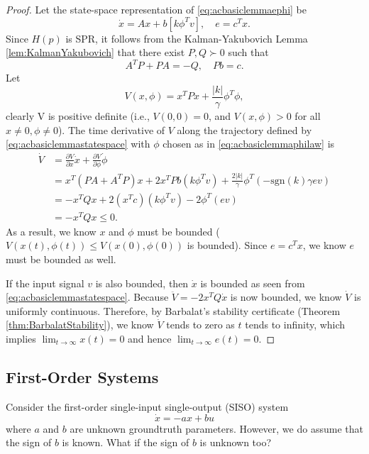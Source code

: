 \documentclass[
]{book}
\theoremstyle{definition}
\theoremstyle{definition}
\theoremstyle{definition}
\theoremstyle{definition}
\theoremstyle{remark}
\begin{document}
\begin{proof}
Let the state-space representation of \eqref{eq:acbasiclemmaephi} be
\begin{equation}
\dot{x} = A x + b [k \phi^T v], \quad e = c^T x.
\label{eq:acbasiclemmastatespace}
\end{equation}
Since \(H(p)\) is SPR, it follows from the Kalman-Yakubovich Lemma \ref{lem:KalmanYakubovich} that there exist \(P,Q \succ 0\) such that
\[
A^T P + P A = -Q, \quad Pb = c.
\]
Let
\[
V(x,\phi) = x^T P x + \frac{|k|}{\gamma} \phi^T \phi,
\]
clearly V is positive definite (i.e., \(V(0,0)=0\), and \(V(x,\phi) > 0\) for all \(x \neq 0, \phi \neq 0\)). The time derivative of \(V\) along the trajectory defined by \eqref{eq:acbasiclemmastatespace} with \(\phi\) chosen as in \eqref{eq:acbasiclemmaphilaw} is
\begin{align}
\dot{V} & = \frac{\partial V}{\partial x} \dot{x} + \frac{\partial V}{\partial \phi} \dot{\phi} \\
&= x^T (PA + A^T P) x + 2 x^T P b (k \phi^T v) + \frac{2|k|}{\gamma} \phi^T (- \mathrm{sgn}(k) \gamma e v) \\
& = - x^T Q x + 2 (x^T c)(k\phi^T v) - 2 \phi^T (e v) \\
& = - x^T Q x \leq 0.
\end{align}
As a result, we know \(x\) and \(\phi\) must be bounded (\(V(x(t),\phi(t)) \leq V(x(0),\phi(0))\) is bounded). Since \(e = c^T x\), we know \(e\) must be bounded as well.

If the input signal \(v\) is also bounded, then \(\dot{x}\) is bounded as seen from \eqref{eq:acbasiclemmastatespace}. Because \(\ddot{V} = -2x^T Q \dot{x}\) is now bounded, we know \(\dot{V}\) is uniformly continuous. Therefore, by Barbalat's stability certificate (Theorem \ref{thm:BarbalatStability}), we know \(\dot{V}\) tends to zero as \(t\) tends to infinity, which implies \(\lim_{t \rightarrow \infty} x(t) = 0\) and hence \(\lim_{t \rightarrow \infty} e(t) = 0\).
\end{proof}

\hypertarget{first-order-systems}{%
\subsection{First-Order Systems}\label{first-order-systems}}

Consider the first-order single-input single-output (SISO) system
\begin{equation}
\dot{x} = - a x + b u
\label{eq:ac-first-linear}
\end{equation}
where \(a\) and \(b\) are unknown groundtruth parameters. However, we do assume that the sign of \(b\) is known. {What if the sign of \(b\) is unknown too?}
\end{document}
